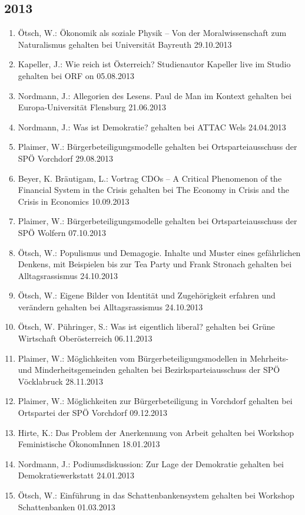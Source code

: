\subsection*{2013}
\begin{enumerate}
	\item Ötsch, W.: Ökonomik als soziale Physik – Von der Moralwissenschaft zum Naturalismus gehalten bei Universität Bayreuth 29.10.2013
	\item Kapeller, J.: Wie reich ist Österreich? Studienautor Kapeller live im Studio gehalten bei ORF on 05.08.2013
	\item Nordmann, J.: Allegorien des Lesens. Paul de Man im Kontext gehalten bei Europa-Universität Flensburg 21.06.2013
	\item Nordmann, J.: Was ist Demokratie? gehalten bei ATTAC Wels 24.04.2013
	\item Plaimer, W.: Bürgerbeteiligungsmodelle gehalten bei Ortsparteiausschuss der SPÖ Vorchdorf 29.08.2013
	\item Beyer, K. Bräutigam, L.: Vortrag CDOs -- A Critical Phenomenon of the Financial System in the Crisis gehalten bei The Economy in Crisis and the Crisis in Economics 10.09.2013
	\item Plaimer, W.: Bürgerbeteiligungsmodelle gehalten bei Ortsparteiausschuss der SPÖ Wolfern 07.10.2013
	\item Ötsch, W.: Populismus und Demagogie. Inhalte und Muster eines gefährlichen Denkens, mit Beispielen bis zur Tea Party und Frank Stronach gehalten bei Alltagsrassismus 24.10.2013
	\item Ötsch, W.: Eigene Bilder von Identität und Zugehörigkeit erfahren und verändern gehalten bei Alltagsrassismus 24.10.2013
	\item Ötsch, W. Pühringer, S.: Was ist eigentlich liberal? gehalten bei Grüne Wirtschaft Oberösterreich 06.11.2013
	\item Plaimer, W.: Möglichkeiten vom Bürgerbeteiligungsmodellen in Mehrheits- und Minderheitsgemeinden gehalten bei Bezirksparteiausschuss der SPÖ Vöcklabruck 28.11.2013
	\item Plaimer, W.: Möglichkeiten zur Bürgerbeteiligung in Vorchdorf gehalten bei Ortspartei der SPÖ Vorchdorf 09.12.2013
	\item Hirte, K.: Das Problem der Anerkennung von Arbeit gehalten bei Workshop Feministische ÖkonomInnen 18.01.2013
	\item Nordmann, J.: Podiumsdiskussion: Zur Lage der Demokratie gehalten bei Demokratiewerkstatt 24.01.2013
	\item Ötsch, W.: Einführung in das Schattenbankensystem gehalten bei Workshop Schattenbanken 01.03.2013

\end{enumerate}
